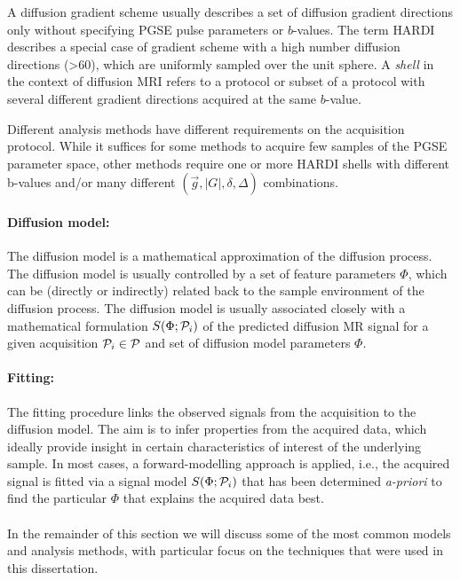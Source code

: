A diffusion gradient scheme usually describes a set of diffusion gradient directions only without specifying PGSE pulse parameters or $b$-values. The term \gls{HARDI} describes a special case of gradient scheme with a high number diffusion directions (>60), which are uniformly sampled over the unit sphere\citep{Tuch:2002,Tournier:2011}. A \textit{shell} in the context of diffusion MRI refers to a protocol or subset of a protocol with several different gradient directions acquired at the same $b$-value. 


Different analysis methods have different requirements on the acquisition protocol. While it suffices for some methods to acquire few samples of the PGSE parameter space, other methods require one or more HARDI shells with different b-values and/or many different $(\vec{g},|G|,\delta,\Delta)$ combinations. 



\paragraph{Diffusion model:} The diffusion model is a mathematical approximation of the diffusion process. The diffusion model is usually controlled by a set of feature parameters $\Phi$, which can be (directly or indirectly) related back to the sample environment of the diffusion process. The diffusion model is usually associated closely with a mathematical formulation $S(\Phi;\mathcal{P}_i)$ of the predicted diffusion MR signal for a given acquisition $\mathcal{P}_i \in \mathcal{P}$ and set of diffusion model parameters $\Phi$.
\paragraph{Fitting:} The fitting procedure links the observed signals from the acquisition to the diffusion model. The aim is to infer properties from the acquired data, which ideally provide insight in certain characteristics of interest of the underlying sample. In most cases, a forward-modelling approach is applied, i.e., the acquired signal is fitted via a signal model $S(\Phi;\mathcal{P}_i)$ that has been determined \emph{a-priori} to find the particular $\Phi$ that explains the acquired data best.  
\paragraph{}
In the remainder of this section we will discuss some of the most common models and analysis methods, with particular focus on the techniques that were used in this dissertation. 
